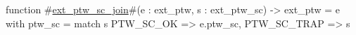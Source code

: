 function #\hyperref[sailRISCVzextzyptwzysczyjoin]{ext\_ptw\_sc\_join}#(e : ext_ptw, s : ext_ptw_sc) -> ext_ptw =
  { e with ptw_sc =
      match s {
        PTW_SC_OK => e.ptw_sc,
        PTW_SC_TRAP => s
      }
  }
